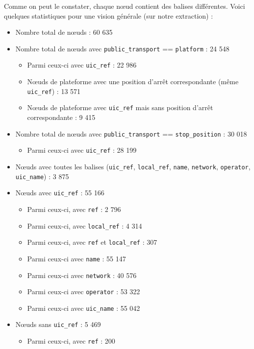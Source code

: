 Comme on peut le constater, chaque nœud contient des balises différentes. Voici quelques statistiques pour une vision générale (sur notre extraction) :
\begin{itemize}
    \item Nombre total de nœuds : 60 635
    \item Nombre total de nœuds avec \texttt{public\_transport} == \texttt{platform} : 24 548
    \begin{itemize}
        \item Parmi ceux-ci avec \texttt{uic\_ref} : 22 986
        \item Nœuds de plateforme avec une position d'arrêt correspondante (même \texttt{uic\_ref}) : 13 571
        \item Nœuds de plateforme avec \texttt{uic\_ref} mais sans position d'arrêt correspondante : 9 415
    \end{itemize}
    \item Nombre total de nœuds avec \texttt{public\_transport} == \texttt{stop\_position} : 30 018
    \begin{itemize}
        \item Parmi ceux-ci avec \texttt{uic\_ref} : 28 199
    \end{itemize}
    \item Nœuds avec toutes les balises (\texttt{uic\_ref}, \texttt{local\_ref}, \texttt{name}, \texttt{network}, \texttt{operator}, \texttt{uic\_name}) : 3 875
    \item Nœuds avec \texttt{uic\_ref} : 55 166
    \begin{itemize}
        \item Parmi ceux-ci, avec \texttt{ref} : 2 796
        \item Parmi ceux-ci, avec \texttt{local\_ref} : 4 314
        \item Parmi ceux-ci, avec \texttt{ref} et \texttt{local\_ref} : 307
        \item Parmi ceux-ci avec \texttt{name} : 55 147
        \item Parmi ceux-ci avec \texttt{network} : 40 576
        \item Parmi ceux-ci avec \texttt{operator} : 53 322
        \item Parmi ceux-ci avec \texttt{uic\_name} : 55 042
    \end{itemize}
    \item Nœuds sans \texttt{uic\_ref} : 5 469
    \begin{itemize}
        \item Parmi ceux-ci, avec \texttt{ref} : 200

\end{itemize}
\end{itemize}
